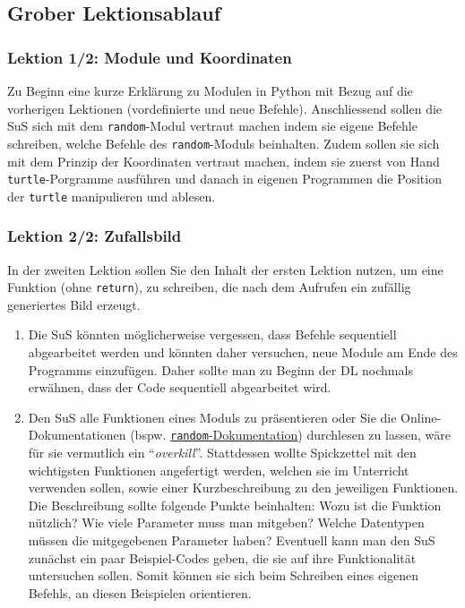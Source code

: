 \begin{myExBox}[title=DL \themycounter]
\subsection*{Grober Lektionsablauf}
\subsubsection*{Lektion 1/2: Module und Koordinaten}
Zu Beginn eine kurze Erklärung zu Modulen in Python mit Bezug auf die vorherigen Lektionen (vordefinierte und neue Befehle). Anschliessend sollen die SuS sich mit dem \lstinline|random|-Modul vertraut machen indem sie eigene Befehle schreiben, welche Befehle des \lstinline|random|-Moduls beinhalten. Zudem sollen sie sich mit dem Prinzip der Koordinaten vertraut machen, indem sie zuerst von Hand \lstinline|turtle|-Porgramme ausführen und danach in eigenen Programmen die Position der \lstinline|turtle| manipulieren und ablesen.

\subsubsection*{Lektion 2/2: Zufallsbild}
In der zweiten Lektion sollen Sie den Inhalt der ersten Lektion nutzen, um eine Funktion (ohne \lstinline|return|), zu schreiben, die nach dem Aufrufen ein zufällig generiertes Bild erzeugt.


\begin{myExBox}[title=Mögliche Schwierigkeiten \& geeignete Massnahmen]
\begin{enumerate}
    \item Die SuS könnten möglicherweise vergessen, dass Befehle sequentiell abgearbeitet werden und könnten daher versuchen, neue Module am Ende des Programms einzufügen. Daher sollte man zu Beginn der DL nochmals erwähnen, dass der Code sequentiell abgearbeitet wird.
    \item Den SuS alle Funktionen eines Moduls zu präsentieren oder Sie die Online-Dokumentationen (bspw. \href{https://docs.python.org/3/library/random.html}{\lstinline|random|-Dokumentation}) durchlesen zu lassen, wäre für sie vermutlich ein  ``\textit{overkill}''. Stattdessen wollte Spickzettel mit den wichtigsten Funktionen angefertigt werden, welchen sie im Unterricht verwenden sollen, sowie einer Kurzbeschreibung zu den jeweiligen Funktionen. Die Beschreibung sollte folgende Punkte beinhalten: Wozu ist die Funktion nützlich? Wie viele Parameter muss man mitgeben? Welche Datentypen müssen die mitgegebenen Parameter haben? Eventuell kann man den SuS zunächst ein paar Beispiel-Codes geben, die sie auf ihre Funktionalität untersuchen sollen. Somit können sie sich beim Schreiben eines eigenen Befehls, an diesen Beispielen orientieren.
\end{enumerate}
\end{myExBox}
\end{myExBox}
\newpage{}

